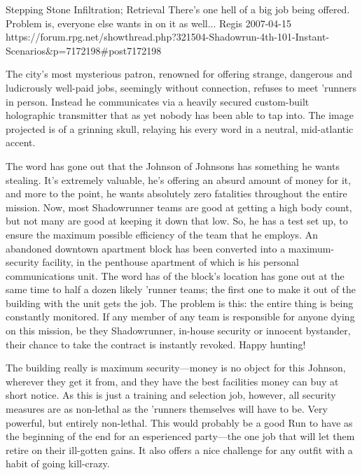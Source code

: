 \begin{scenario}{Stepping Stone}
	{Infiltration; Retrieval}
	{There's one hell of a big job being offered. Problem is, everyone else wants in on it as well...}
	{Regis}
	{2007-04-15}
	{https://forum.rpg.net/showthread.php?321504-Shadowrun-4th-101-Instant-Scenarios\&p=7172198\#post7172198}

 The city's most mysterious patron, renowned for offering strange, dangerous and ludicrously well-paid jobs, seemingly without connection, refuses to meet 'runners in person. Instead he communicates via a heavily secured custom-built holographic transmitter that as yet nobody has been able to tap into. The image projected is of a grinning skull, relaying his every word in a neutral, mid-atlantic accent.

\synopsis The word has gone out that the Johnson of Johnsons has something he wants stealing. It's extremely valuable, he's offering an absurd amount of money for it, and more to the point, he wants absolutely zero fatalities throughout the entire mission. Now, most Shadowrunner teams are good at getting a high body count, but not many are good at keeping it down that low. So, he has a test set up, to ensure the maximum possible efficiency of the team that he employs. An abandoned downtown apartment block has been converted into a maximum-security facility, in the penthouse apartment of which is his personal communications unit. The word has of the block's location has gone out at the same time to half a dozen likely 'runner teams; the first one to make it out of the building with the unit gets the job. The problem is this: the entire thing is being constantly monitored. If any member of any team is responsible for anyone dying on this mission, be they Shadowrunner, in-house security or innocent bystander, their chance to take the contract is instantly revoked. Happy hunting!

\notes The building really is maximum security---money is no object for this Johnson, wherever they get it from, and they have the best facilities money can buy at short notice. As this is just a training and selection job, however, all security measures are as non-lethal as the 'runners themselves will have to be. Very powerful, but entirely non-lethal. This would probably be a good Run to have as the beginning of the end for an esperienced party---the one job that will let them retire on their ill-gotten gains. It also offers a nice challenge for any outfit with a habit of going kill-crazy. 

\end{scenario}